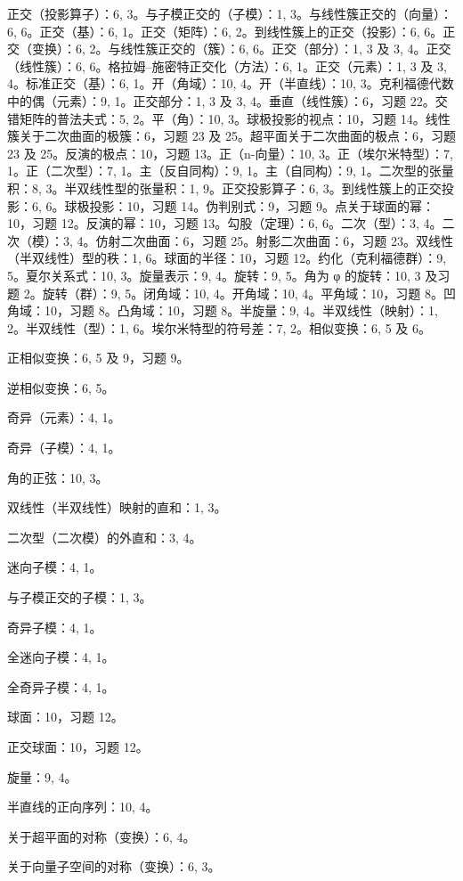 正交（投影算子）：6, 3。与子模正交的（子模）：1, 3。与线性簇正交的（向量）：6, 6。正交（基）：6, 1。正交（矩阵）：6, 2。到线性簇上的正交（投影）：6, 6。正交（变换）：6, 2。与线性簇正交的（簇）：6, 6。正交（部分）：1, 3 及 3, 4。正交（线性簇）：6, 6。格拉姆–施密特正交化（方法）：6, 1。正交（元素）：1, 3 及 3, 4。标准正交（基）：6, 1。开（角域）：10, 4。开（半直线）：10, 3。克利福德代数中的偶（元素）：9, 1。正交部分：1, 3 及 3, 4。垂直（线性簇）：6，习题 22。交错矩阵的普法夫式：5, 2。平（角）：10, 3。球极投影的视点：10，习题 14。线性簇关于二次曲面的极簇：6，习题 23 及 25。超平面关于二次曲面的极点：6，习题 23 及 25。反演的极点：10，习题 13。正（n-向量）：10, 3。正（埃尔米特型）：7, 1。正（二次型）：7, 1。主（反自同构）：9, 1。主（自同构）：9, 1。二次型的张量积：8, 3。半双线性型的张量积：1, 9。正交投影算子：6, 3。到线性簇上的正交投影：6, 6。球极投影：10，习题 14。伪判别式：9，习题 9。点关于球面的幂：10，习题 12。反演的幂：10，习题 13。勾股（定理）：6, 6。二次（型）：3, 4。二次（模）：3, 4。仿射二次曲面：6，习题 25。射影二次曲面：6，习题 23。双线性（半双线性）型的秩：1, 6。球面的半径：10，习题 12。约化（克利福德群）：9, 5。夏尔关系式：10, 3。旋量表示：9, 4。旋转：9, 5。角为 φ 的旋转：10, 3 及习题 2。旋转（群）：9, 5。闭角域：10, 4。开角域：10, 4。平角域：10，习题 8。凹角域：10，习题 8。凸角域：10，习题 8。半旋量：9, 4。半双线性（映射）：1, 2。半双线性（型）：1, 6。埃尔米特型的符号差：7, 2。相似变换：6, 5 及 6。

正相似变换：6, 5 及 9，习题 9。

逆相似变换：6, 5。

奇异（元素）：4, 1。

奇异（子模）：4, 1。

角的正弦：10, 3。

双线性（半双线性）映射的直和：1, 3。

二次型（二次模）的外直和：3, 4。

迷向子模：4, 1。

与子模正交的子模：1, 3。

奇异子模：4, 1。

全迷向子模：4, 1。

全奇异子模：4, 1。

球面：10，习题 12。

正交球面：10，习题 12。

旋量：9, 4。

半直线的正向序列：10, 4。

关于超平面的对称（变换）：6, 4。

关于向量子空间的对称（变换）：6, 3。

